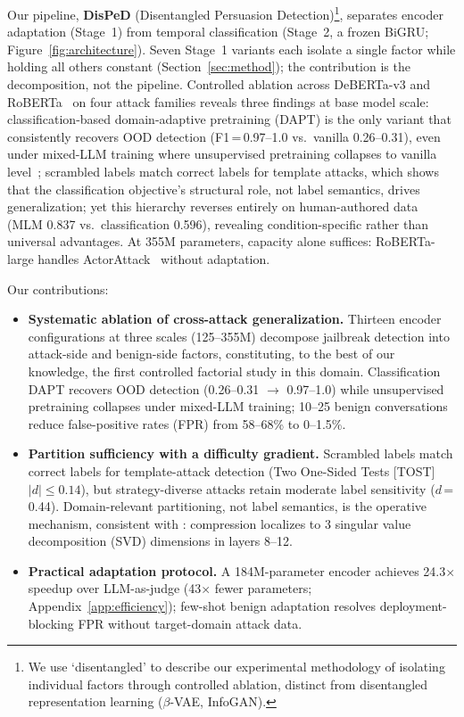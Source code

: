 Our pipeline, \textbf{DisPeD} (Disentangled Persuasion Detection)\footnote{We use `disentangled' to describe our experimental methodology of isolating individual factors through controlled ablation, distinct from disentangled representation learning ($\beta$-VAE, InfoGAN).}, separates encoder adaptation (Stage~1) from temporal classification (Stage~2, a frozen BiGRU; Figure~\ref{fig:architecture}). Seven Stage~1 variants each isolate a single factor while holding all others constant (Section~\ref{sec:method}); the contribution is the decomposition, not the pipeline. Controlled ablation across DeBERTa-v3 and RoBERTa~\citep{liu2019roberta} on four attack families reveals three findings at base model scale: classification-based domain-adaptive pretraining (DAPT) is the only variant that consistently recovers OOD detection (F1\,=\,0.97--1.0 vs.\ vanilla 0.26--0.31), even under mixed-LLM training where unsupervised pretraining collapses to vanilla level~\citep{gururangan2020dontstop}; scrambled labels match correct labels for template attacks, which shows that the classification objective's structural role, not label semantics, drives generalization; yet this hierarchy reverses entirely on human-authored data (MLM 0.837 vs.\ classification 0.596), revealing condition-specific rather than universal advantages. At 355M parameters, capacity alone suffices: RoBERTa-large handles ActorAttack~\citep{ren2024actorattack} without adaptation.

Our contributions:
\begin{itemize}[leftmargin=*, itemsep=2pt, topsep=4pt]
  \item \textbf{Systematic ablation of cross-attack generalization.} Thirteen encoder configurations at three scales (125--355M) decompose jailbreak detection into attack-side and benign-side factors, constituting, to the best of our knowledge, the first controlled factorial study in this domain. Classification DAPT recovers OOD detection (0.26--0.31 $\rightarrow$ 0.97--1.0) while unsupervised pretraining collapses under mixed-LLM training; 10--25 benign conversations reduce false-positive rates (FPR) from 58--68\% to 0--1.5\%.

  \item \textbf{Partition sufficiency with a difficulty gradient.} Scrambled labels match correct labels for template-attack detection (Two One-Sided Tests [TOST] $|d| \leq 0.14$), but strategy-diverse attacks retain moderate label sensitivity ($d$\,=\,0.44). Domain-relevant partitioning, not label semantics, is the operative mechanism, consistent with \citet{zhang2021understanding}: compression localizes to 3 singular value decomposition (SVD) dimensions in layers 8--12.

  \item \textbf{Practical adaptation protocol.} A 184M-parameter encoder achieves 24.3$\times$ speedup over LLM-as-judge (43$\times$ fewer parameters; Appendix~\ref{app:efficiency}); few-shot benign adaptation resolves deployment-blocking FPR without target-domain attack data.
\end{itemize}
